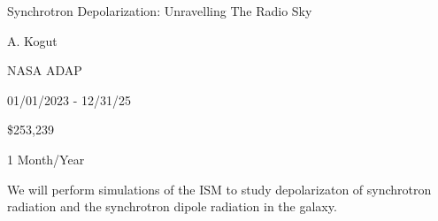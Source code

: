 
 Synchrotron Depolarization: Unravelling The Radio Sky

 A. Kogut

 NASA ADAP

 01/01/2023 - 12/31/25

 \$253,239

 1 Month/Year

We will perform simulations of the ISM to study depolarizaton of synchrotron
radiation and the synchrotron dipole radiation in the galaxy.
